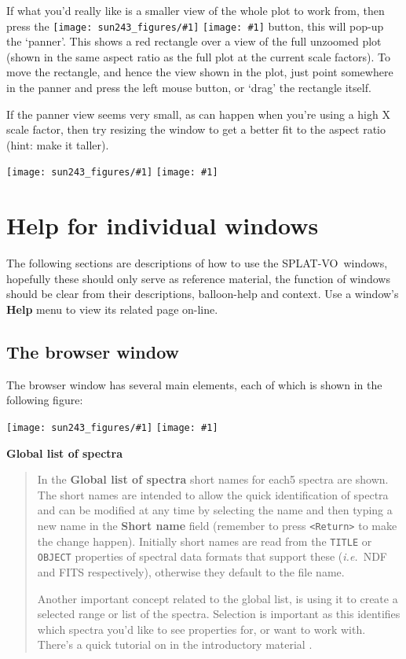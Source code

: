 \documentclass[twoside,11pt,nolof]{starlink}
\providecommand{\SPLAT}{\textsf{SPLAT-VO}}
\providecommand{\mainfigure}[1]
{\begin{center}
    \ifpdf
    \texttt{[image: sun243\_figures/\#1]}
    \else
    \texttt{[image: \#1]}
    \fi
 \end{center}
}
\providecommand{\inline}[1]
        {\ifpdf
          \texttt{[image: sun243\_figures/\#1]}
          \else
          \texttt{[image: \#1]}
          \fi
        }
\renewcommand{\menuitem}[1]{\textbf{#1}}
\newcommand{\labelitem}[1]{\textbf{#1}}
\providecommand{\hitext}[1]{\texttt{#1}}
\providecommand{\ie}{\textit{i.e.}}
\providecommand{\subheading}[1]{\textbf{\large{#1}}}
\begin{document}
If what you'd really like is a smaller view of the whole plot to work
from, then press the \inline{panner} button, this will pop-up the
`panner'. This shows a red rectangle over a view of the full unzoomed
plot (shown in the same aspect ratio as the full plot at the current
scale factors). To move the rectangle, and hence the view shown in the
plot, just point somewhere in the panner and press the left mouse
button, or `drag' the rectangle itself.

If the panner view seems very small, as can happen when you're using a
high X scale factor, then try resizing the window to get a better fit
to the aspect ratio (hint: make it taller).

\mainfigure{pannerwindow}

\section{Help for individual windows}

The following sections are descriptions of how to use the
\SPLAT\ windows, hopefully these should only serve as reference
material, the function of windows should be clear from their
descriptions, balloon-help and context. Use a window's \menuitem{Help}
menu to view its related page on-line.

\newpage
\subsection{The browser window}

The browser window has several main elements, each of which is shown
in the following figure:

\mainfigure{browser5}

\subheading{Global list of spectra}
\begin{quote}
 In the \labelitem{Global list of spectra} short names for each5
 spectra are shown. The short names are intended to allow the quick
 identification of spectra and can be modified at any time by
 selecting the name and then typing a new name in the
 \labelitem{Short name} field (remember to press \hitext{<Return>} to
 make the change happen). Initially short names are read from the
 \hitext{TITLE} or \hitext{OBJECT} properties of spectral data formats
 that support these (\ie\ NDF and FITS respectively), otherwise they
 default to the file name.

 Another important concept related to the global list, is using it to
 create a selected range or list of the spectra. Selection is
 important as this identifies which spectra you'd like to see
 properties for, or want to work with. There's a quick tutorial on
  in the introductory material
 \latex{(\S\ref{selecting_spectra})}.
\end{quote}
\end{document}
